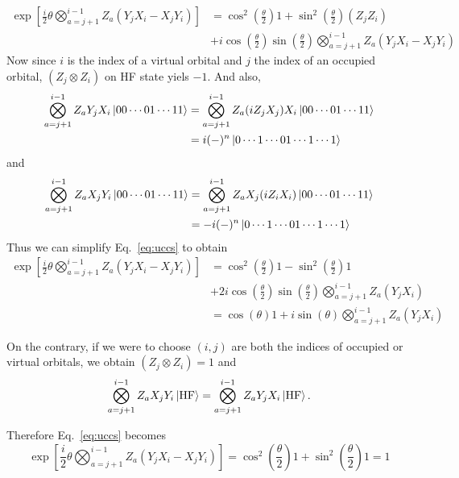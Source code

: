 \documentclass[11pt, oneside]{article}   	%
\begin{document}
\begin{align}
\label{eq:uccs}
\exp \left[ \frac{i}{2} \theta \bigotimes^{i-1}_{a=j+1} Z_a  (Y_j X_i - X_j Y_i) \right] 
&= \cos^2 \left( \frac{\theta}{2} \right) 1 +  \sin^2 \left( \frac{\theta}{2} \right) (Z_j Z_i) \\
&+ i \cos  \left( \frac{\theta}{2} \right) \sin \left( \frac{\theta}{2} \right) \bigotimes^{i-1}_{a=j+1} Z_a  (Y_j X_i - X_j Y_i) 
\end{align}
Now since $i$ is the index of a virtual orbital and $j$ the index of an occupied orbital, $(Z_j \otimes Z_i)$ on HF state yiels $-1$.
And also,
\begin{align}
\bigotimes^{i-1}_{a=j+1} Z_a Y_j X_i \ket{00\cdots01\cdots11} 
&= \bigotimes^{i-1}_{a=j+1} Z_a (i Z_j X_j) X_i \ket{00\cdots01\cdots11} \\
&= i (-)^{n} \ket{0\cdots 1 \cdots01\cdots1 \cdots 1}
\end{align}
and 
\begin{align}
\bigotimes^{i-1}_{a=j+1} Z_a X_j Y_i \ket{00\cdots01\cdots11} 
&= \bigotimes^{i-1}_{a=j+1} Z_a X_j (i Z_i X_i) \ket{00\cdots01\cdots11} \\
&= - i (-)^{n} \ket{0\cdots 1 \cdots01\cdots1 \cdots 1}
\end{align}
Thus we can simplify Eq.~\ref{eq:uccs} to obtain
\begin{align}
\exp \left[ \frac{i}{2} \theta \bigotimes^{i-1}_{a=j+1} Z_a  (Y_j X_i - X_j Y_i) \right] 
&= \cos^2 \left( \frac{\theta}{2} \right) 1 -  \sin^2 \left( \frac{\theta}{2} \right) 1 \\
&+ 2 i \cos  \left( \frac{\theta}{2} \right) \sin \left( \frac{\theta}{2} \right) \bigotimes^{i-1}_{a=j+1} Z_a  (Y_j X_i) \\
&= \cos (\theta) 1 + i \sin (\theta) \bigotimes^{i-1}_{a=j+1} Z_a  (Y_j X_i) 
\end{align}

On the contrary, if we were to choose $(i, j)$ are both the indices of occupied or virtual orbitals, we obtain $(Z_j \otimes Z_i) = 1$ and 
\begin{align}
\bigotimes^{i-1}_{a=j+1} Z_a X_j Y_i \ket{\mathrm{HF}} 
= \bigotimes^{i-1}_{a=j+1} Z_a Y_j X_i \ket{\mathrm{HF}}.
\end{align}

Therefore Eq.~\ref{eq:uccs} becomes
\begin{equation}
\exp \left[ \frac{i}{2} \theta \bigotimes^{i-1}_{a=j+1} Z_a  (Y_j X_i - X_j Y_i) \right] 
= \cos^2 \left( \frac{\theta}{2} \right) 1 +  \sin^2 \left( \frac{\theta}{2} \right) 1
= 1
\end{equation}
\end{document}
